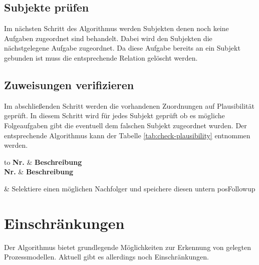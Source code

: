 





\section{Subjekte prüfen} %
\label{sub:subjekte_prufen}
Im nächsten Schritt des Algorithmus werden Subjekten denen noch keine Aufgaben zugeordnet sind behandelt. Dabei wird den Subjekten die nächstgelegene Aufgabe zugeordnet. Da diese Aufgabe bereits an ein Subjekt gebunden ist muss die entsprechende Relation gelöscht werden.

\section{Zuweisungen verifizieren} %
\label{sub:zuweisungen_verifizieren}
Im abschließenden Schritt werden die vorhandenen Zuordnungen auf Plausibilität geprüft. In diesem Schritt wird für jedes Subjekt geprüft ob es mögliche Folgeaufgaben gibt die eventuell dem falschen Subjekt zugeordnet wurden. Der entsprechende Algorithmus kann der Tabelle \ref{tab:check-plausibility} entnommen werden.

{
\begin{center}
	\begin{longtabu} to  
		\textbf{Nr.} & \textbf{Beschreibung} \\ \midrule \endfirsthead
		\textbf{Nr.} & \textbf{Beschreibung} \\ \midrule \endhead
		\endfoot
 	   	\caption{Algorithmus - Plausibilität prüfen\label{tab:check-plausibility}}
 	   	 & Selektiere einen möglichen Nachfolger und speichere diesen untern posFollowup \\ \midrule
	\end{longtabu}
\end{center}
}


\chapter{Einschränkungen} %
\label{cha:einschrankungen}
Der Algorithmus bietet grundlegende Möglichkeiten zur Erkennung von gelegten Prozessmodellen. Aktuell gibt es allerdings noch Einschränkungen.

